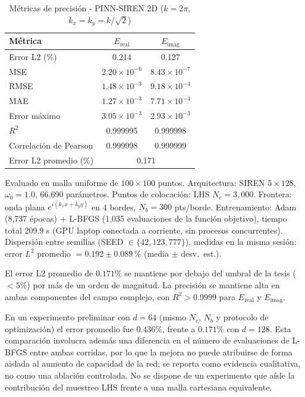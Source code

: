 \begin{table}[htbp]
\centering
\begin{threeparttable}
\caption{Métricas de precisión - PINN-SIREN 2D ($k = 2\pi$, $k_x = k_y = k/\sqrt{2}$)}
\label{tab:resultados2d}
\begin{tabular}{lcc}
\toprule
Métrica & $E_{\mathrm{real}}$ & $E_{\mathrm{imag}}$ \\
\midrule
Error L2 (\%)          & 0.214 & 0.127 \\
MSE                    & $2.20 \times 10^{-6}$ & $8.43 \times 10^{-7}$ \\
RMSE                   & $1.48 \times 10^{-3}$ & $9.18 \times 10^{-4}$ \\
MAE                    & $1.27 \times 10^{-3}$ & $7.71 \times 10^{-4}$ \\
Error máximo           & $3.05 \times 10^{-3}$ & $2.93 \times 10^{-3}$ \\
$R^2$                  & 0.999995 & 0.999998 \\
Correlación de Pearson & 0.999998 & 0.999999 \\
\midrule
Error L2 promedio (\%) & \multicolumn{2}{c}{0.171} \\
\bottomrule
\end{tabular}
\begin{tablenotes}
\small
\item Evaluado en malla uniforme de $100 \times 100$ puntos.
      Arquitectura: SIREN $5 \times 128$, $\omega_0 = 1.0$, 66{,}690 parámetros.
      Puntos de colocación: LHS $N_c = 3{,}000$.
      Frontera: onda plana $e^{i(k_x x + k_y y)}$ en 4 bordes, $N_b = 300$ pts/borde.
      Entrenamiento: Adam (8{,}737 épocas) + L-BFGS (1{,}035 evaluaciones de
      la función objetivo), tiempo total 209.9 s (GPU laptop conectada a
      corriente, sin procesos concurrentes).
      Dispersión entre semillas (SEED $\in \{42, 123, 777\}$),
      medidas en la misma sesión:
      error $L^2$ promedio $= 0.192 \pm 0.089$\,\% (media $\pm$ desv.\ est.).
\end{tablenotes}
\end{threeparttable}
\end{table}

El error L2 promedio de $0.171\%$ se mantiene por debajo del umbral de la tesis ($< 5\%$)
por más de un orden de magnitud. La precisión se mantiene alta en ambas componentes del
campo complejo, con $R^2 > 0.9999$ para $E_{\mathrm{real}}$ y $E_{\mathrm{imag}}$.

En un experimento preliminar con $d = 64$ (mismo $N_c$, $N_b$ y protocolo de
optimización) el error promedio fue $0.436\%$, frente a $0.171\%$ con $d = 128$.
Esta comparación involucra además una diferencia en el número de evaluaciones
de L-BFGS entre ambas corridas, por lo que la mejora no puede atribuirse de
forma aislada al aumento de capacidad de la red; se reporta como evidencia
cualitativa, no como una ablación controlada. No se dispone de un
experimento que aísle la contribución del muestreo LHS frente a una malla
cartesiana equivalente.

